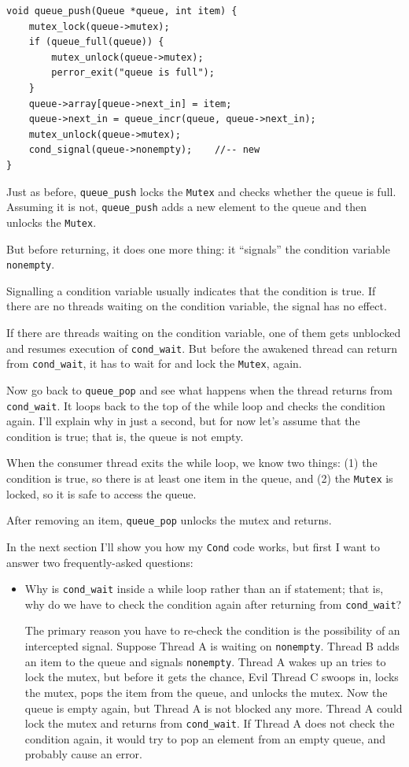 \documentclass[12pt]{book}
\begin{document}
{\begin{verbatim}
void queue_push(Queue *queue, int item) {
    mutex_lock(queue->mutex);
    if (queue_full(queue)) {
        mutex_unlock(queue->mutex);
        perror_exit("queue is full");
    }
    queue->array[queue->next_in] = item;
    queue->next_in = queue_incr(queue, queue->next_in);
    mutex_unlock(queue->mutex);
    cond_signal(queue->nonempty);    //-- new
}
\end{verbatim}

Just as before, \verb"queue_push" locks the {\tt Mutex} and checks
whether the queue is full.  Assuming it is not, \verb"queue_push" adds
a new element to the queue and then unlocks the {\tt Mutex}.

But before returning, it does one more thing: it ``signals'' the
condition variable {\tt nonempty}.

Signalling a condition variable usually indicates that the condition is
true.  If there are no threads waiting
on the condition variable, the signal has no effect.

If there are threads waiting on the condition variable, one of them
gets unblocked and resumes execution of \verb"cond_wait".  But before
the awakened thread can return from \verb"cond_wait", it has
to wait for and lock the {\tt Mutex}, again.

Now go back to \verb"queue_pop" and see what happens when the thread
returns from \verb"cond_wait".  It loops back to the top of the while
loop and checks the condition again.  I'll explain why in just a
second, but for now let's assume that the condition is true; that is,
the queue is not empty.

When the consumer thread exits the while loop, we know two things: (1)
the condition is true, so there is at least one item in the queue, and
(2) the {\tt Mutex} is locked, so it is safe to access the queue.

After removing an item, \verb"queue_pop" unlocks the mutex
and returns.

In the next section I'll show you how my {\tt Cond} code works, but first I
want to answer two frequently-asked questions:

\begin{itemize}

\item Why is \verb"cond_wait" inside a while loop rather than an if
statement; that is, why do we have to check the condition again after
returning from \verb"cond_wait"?

The primary reason you have to re-check the condition is the possibility
of an intercepted signal.  Suppose Thread A is waiting on {\tt nonempty}.
Thread B adds an item to the queue and signals {\tt nonempty}.  Thread
A wakes up an tries to lock the mutex, but before it gets the chance,
Evil Thread C swoops in, locks the mutex, pops the item from the
queue, and unlocks the mutex.  Now the queue is empty again, but
Thread A is not blocked any more.  Thread A could lock the mutex and
returns from \verb"cond_wait".  If Thread A does not check the condition
again, it would try to pop an element from an empty queue, and probably
cause an error.


\end{itemize}}
\end{document}
